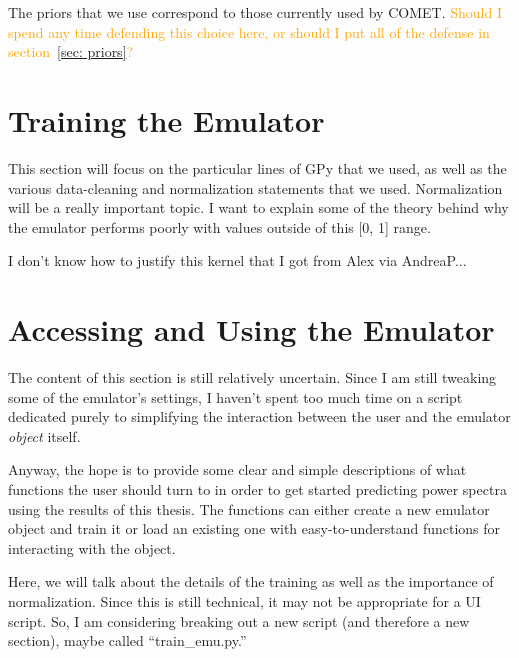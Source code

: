 The priors that we use correspond to those currently used by COMET. \textcolor{orange}{Should I spend any time defending this choice here, or should I put all of the defense in section~\ref{sec: priors}?}


\section{Training the Emulator}
\label{sec: emu_training}


This section will focus on the particular lines of GPy that we used, as well
as the various data-cleaning and normalization statements that we used.
Normalization will be a really important topic. I want to explain some of
the theory behind why the emulator performs poorly with values outside of this
[0, 1] range.

I don't know how to justify this kernel that I got from Alex via AndreaP...

\section{Accessing and Using the Emulator}


The content of this section is still relatively uncertain. Since I am still tweaking some of the emulator's settings, I haven't spent too much time on a script dedicated purely to simplifying the interaction between the user and the emulator \textit{object} itself.

Anyway, the hope is to provide some clear and simple descriptions of what functions the user should turn to in order to get started predicting power spectra using the results of this thesis. The functions can either create a new emulator object and train it or load an existing one with easy-to-understand functions for interacting with the object.

Here, we will talk about the details of the training as well as the importance of normalization. Since this is still technical, it may not be appropriate for a UI script. So, I am considering breaking out a new script (and therefore a new section), maybe called ``train\_emu.py.''
